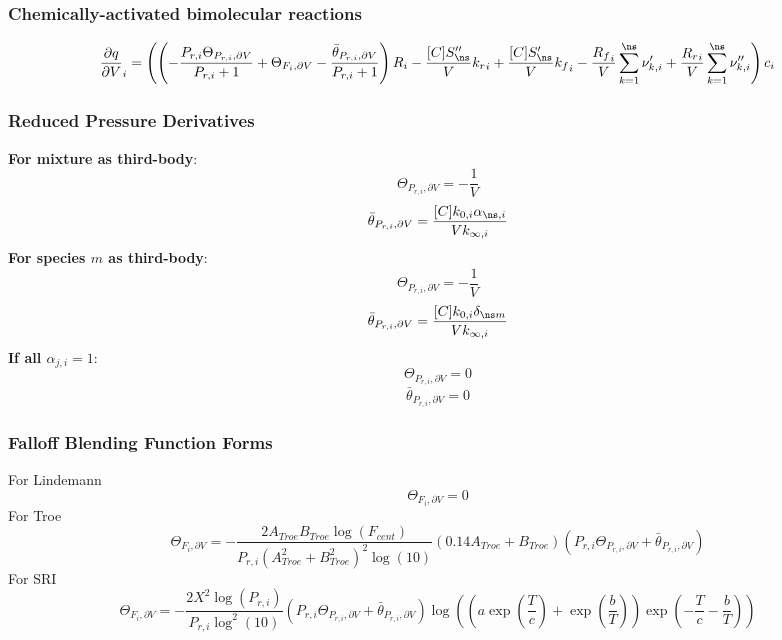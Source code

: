 \documentclass[a4paper,10pt]{article}
\begin{document}
\subsubsection{Chemically-activated bimolecular reactions}
\begin{dmath} \frac{\partial q }{\partial V }_{i} = \left(\left(- \frac{P_{r, i} \Theta_{P_{r,i}, \partial V}}{P_{r, i} + 1} + \Theta_{F_i, \partial V} - \frac{\bar{\theta}_{P_{r, i}, \partial V}}{P_{r, i} + 1}\right) R_{i} - \frac{[C] S^{\prime\prime}_{\ns}}{V} {k_r}_{i} + \frac{[C] S^{\prime}_{\ns}}{V} {k_f}_{i} - \frac{{R_f}_{i}}{V} \sum_{k=1}^{\ns} \nu^{\prime}_{k,i} + \frac{{R_r}_{i}}{V} \sum_{k=1}^{\ns} \nu^{\prime\prime}_{k,i}\right) c_{i}\end{dmath} 
\subsubsection{Reduced Pressure Derivatives}
\textbf{For mixture as third-body}:
\begin{dmath} \Theta_{P_{r,i}, \partial V} = - \frac{1}{V}\end{dmath} 
\begin{dmath} \bar{\theta}_{P_{r, i}, \partial V} = \frac{[C] k_{0, i} \alpha_{\ns,i}}{V k_{\infty, i}}\end{dmath} 
\textbf{For species $m$ as third-body}:
\begin{dmath} \Theta_{P_{r,i}, \partial V} = - \frac{1}{V}\end{dmath} 
\begin{dmath} \bar{\theta}_{P_{r, i}, \partial V} = \frac{[C] k_{0, i} \delta_{\ns m}}{V k_{\infty, i}}\end{dmath} 
\textbf{If all $\alpha_{j,i} = 1$}:
\begin{dmath} \Theta_{P_{r,i}, \partial V} = 0\end{dmath} 
\begin{dmath} \bar{\theta}_{P_{r, i}, \partial V} = 0\end{dmath} 
\subsubsection{Falloff Blending Function Forms}
For Lindemann
\begin{dmath} \Theta_{F_i, \partial V} = 0\end{dmath} 
For Troe
\begin{dmath} \Theta_{F_i, \partial V} = - \frac{2 A_{Troe} B_{Troe} \log{\left (F_{cent} \right )}}{P_{r, i} \left(A_{Troe}^{2} + B_{Troe}^{2}\right)^{2} \log{\left (10 \right )}} \left(0.14 A_{Troe} + B_{Troe}\right) \left(P_{r, i} \Theta_{P_{r,i}, \partial V} + \bar{\theta}_{P_{r, i}, \partial V}\right)\end{dmath} 
For SRI
\begin{dmath} \Theta_{F_i, \partial V} = - \frac{2 X^{2} \log{\left (P_{r, i} \right )}}{P_{r, i} \log^{2}{\left (10 \right )}} \left(P_{r, i} \Theta_{P_{r,i}, \partial V} + \bar{\theta}_{P_{r, i}, \partial V}\right) \log{\left (\left(a \operatorname{exp}\left({\frac{T}{c}}\right) + \operatorname{exp}\left({\frac{b}{T}}\right)\right) \operatorname{exp}\left({- \frac{T}{c} - \frac{b}{T}}\right) \right )}\end{dmath} 
\end{document}
